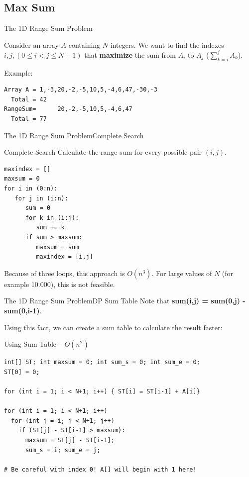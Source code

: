 \subsection{Max Sum}

\begin{frame}[fragile]{The 1D Range Sum Problem}

  Consider an array $A$ containing $N$ integers. We want to find the indexes $i,j, (0 \leq i < j \leq N-1)$ that {\bf maximize} the sum from $A_i$ to $A_j$ ($\sum_{k=i}^{j} A_k$).
  \bigskip

  Example:
\begin{verbatim}
Array A = 1,-3,20,-2,-5,10,5,-4,6,47,-30,-3
  Total = 42
RangeSum=      20,-2,-5,10,5,-4,6,47
  Total = 77
\end{verbatim}
\end{frame}

\begin{frame}[fragile]{The 1D Range Sum Problem}{Complete Search}
  \begin{block}{Complete Search}
    Calculate the range sum for every possible pair $(i,j)$.

{\smaller
\begin{verbatim}
maxindex = []
maxsum = 0
for i in (0:n):
   for j in (i:n):
      sum = 0
      for k in (i:j):
         sum += k
      if sum > maxsum:
         maxsum = sum
         maxindex = [i,j]
\end{verbatim}
}
  \end{block}

  Because of three loops, this approach is $O(n^3)$. For large values of $N$ (for example 10.000), this is not feasible.
\end{frame}

\begin{frame}[fragile]{The 1D Range Sum Problem}{DP Sum Table}
  Note that {\bf sum(i,j) = sum(0,j) - sum(0,i-1)}.\medskip

  Using this fact, we can create a sum table to calculate the result faster:

  \begin{block}{Using Sum Table -- $O(n^2)$}
{\smaller
\begin{verbatim}
int[] ST; int maxsum = 0; int sum_s = 0; int sum_e = 0;
ST[0] = 0;

for (int i = 1; i < N+1; i++) { ST[i] = ST[i-1] + A[i]}

for (int i = 1; i < N+1; i++)
  for (int j = i; j < N+1; j++)
    if (ST[j] - ST[i-1] > maxsum):
      maxsum = ST[j] - ST[i-1];
      sum_s = i; sum_e = j;

# Be careful with index 0! A[] will begin with 1 here!
\end{verbatim}
}
  \end{block}
\end{frame}


